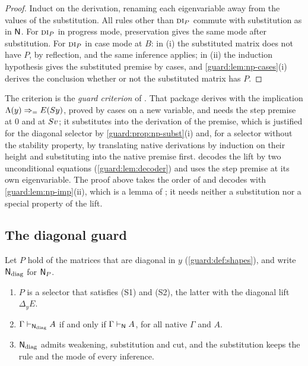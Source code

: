 \begin{proof}
Induct on the derivation, renaming each eigenvariable away from the values
of the substitution.  All rules other than $\rulename{DI}_P$ commute with
substitution as in $\mathsf{N}$.  For $\rulename{DI}_P$ in progress mode,
preservation gives the same mode after substitution.  For $\rulename{DI}_P$
in case mode at $B$: in (i) the substituted matrix does not have $P$, by
reflection, and the same inference applies; in (ii) the induction hypothesis
gives the substituted premise by cases, and \cref{guard:lem:np-cases}(i)
derives the conclusion whether or not the substituted matrix has $P$.
\end{proof}

\begin{remark}
\label{guard:rem:selector-versions}
The criterion is the \emph{guard criterion} of .  That
package derives  with the implication
$\Lambda(y)\Rightarrow_{=}E(S y)$, proved by cases on a new variable, and
needs the step premise at $0$ and at $S v$; it substitutes into the
derivation of the premise, which is justified for the diagonal selector by
\cref{guard:prop:np-subst}(i) and, for a selector without the stability
property, by translating native derivations by induction on their height
and substituting into the native premise first.   decodes
the lift by two unconditional equations (\cref{guard:lem:decoder}) and uses
the step premise at its own eigenvariable.  The proof above takes the order
of  and decodes with \cref{guard:lem:np-imp}(ii), which is
a lemma of ; it needs neither a substitution nor a
special property of the lift.
\end{remark}

\subsection{The diagonal guard}

\begin{theorem}
\label{guard:thm:diagonal}
Let $P$ hold of the matrices that are diagonal in $y$
(\cref{guard:def:shapes}), and write $\mathsf{N}_{\mathrm{diag}}$ for $\mathsf{N}_P$.
\begin{enumerate}[label=\textup{(\roman*)}]
\item $P$ is a selector that satisfies \textup{(S1)} and \textup{(S2)}, the
 latter with the diagonal lift $\Delta_yE$.
\item $\Gamma\vdash_{\mathsf{N}_{\mathrm{diag}}}A$ if and only if
 $\Gamma\vdash_{\mathsf{N}}A$, for all native $\Gamma$ and $A$.
\item $\mathsf{N}_{\mathrm{diag}}$ admits weakening, substitution and cut, and
 the substitution keeps the rule and the mode of every inference.
\end{enumerate}
\end{theorem}

